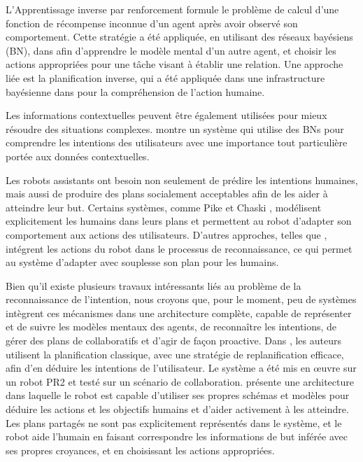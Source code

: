 \documentclass[a4paper,11pt,twoside]{StyleThese}
\begin{document}
L'Apprentissage inverse par renforcement \cite{ng2000algorithms} formule le problème de calcul d'une fonction de récompense inconnue d'un agent après avoir observé son comportement. Cette stratégie a été appliquée, en utilisant des réseaux bayésiens (BN), dans \cite{Nagai2015} afin d'apprendre le modèle mental d'un autre agent, et choisir les actions appropriées pour une tâche visant à établir une relation. Une approche liée est la planification inverse, qui a été appliquée dans une infrastructure bayésienne dans \cite{baker2009action} pour la compréhension de l'action humaine.

Les informations contextuelles peuvent être également utilisées pour mieux résoudre des situations complexes. \cite{Liu2014} montre un système qui utilise des BNs pour comprendre les intentions des utilisateurs avec une importance tout particulière portée aux données contextuelles.

Les robots assistants ont besoin non seulement de prédire les intentions humaines, mais aussi de produire des plans socialement acceptables afin de les aider à atteindre leur but. Certains systèmes, comme Pike \cite{karpas2015robust} et Chaski \cite{shah2011improved}, modélisent explicitement les humains dans leurs plans et permettent au robot d'adapter son comportement aux actions des utilisateurs. D'autres approches, telles que \cite{levine2014concurrent}, intégrent les actions du robot dans le processus de reconnaissance, ce qui permet au système d'adapter avec souplesse son plan pour les humains.

Bien qu'il existe plusieurs travaux intéressants liés au problème de la reconnaissance de l'intention, nous croyons que, pour le moment, peu de systèmes intègrent ces mécanismes dans une architecture complète, capable de représenter et de suivre les modèles mentaux des agents, de reconnaître les intentions, de gérer des plans de collaboratifs et d'agir de façon proactive. Dans \cite{talamadupula2014coordination}, les auteurs utilisent la planification classique, avec une stratégie de replanification efficace, afin d'en déduire les intentions de l'utilisateur. Le système a été mis en œuvre sur un robot PR2 et testé sur un scénario de collaboration. \cite{breazeal2009embodied} présente une architecture dans laquelle le robot est capable d'utiliser ses propres schémas et modèles pour déduire les actions et les objectifs humains et d'aider activement à les atteindre. Les plans partagés ne sont pas explicitement représentés dans le système, et le robot aide l'humain en faisant correspondre les informations de but inférée avec ses propres croyances, et en choisissant les actions appropriées.
\end{document}
